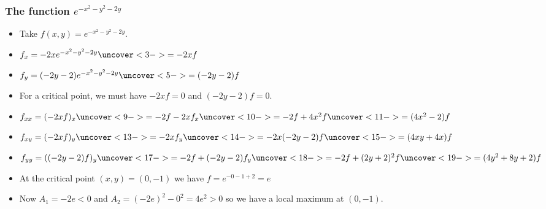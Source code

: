 \documentclass[9pt]{beamer}
\begin{document}
\begin{frame}[t]
 \frametitle{The function $e^{-x^2-y^2-2y}$}
 
 \begin{itemize}
  \item<1-> Take $f(x,y)=e^{-x^2-y^2-2y}$.
  \item<2-> $f_x=-2xe^{-x^2-y^2-2y}\uncover<3->{=-2xf}$
  \item<4-> $f_y=(-2y-2)e^{-x^2-y^2-2y}\uncover<5->{=(-2y-2)f}$
  \item<6-> For a critical point, we must have $-2xf=0$ and $(-2y-2)f=0$.
  \item<8-> $f_{xx}=(-2xf)_x\uncover<9->{=-2f-2xf_x}\uncover<10->{=-2f+4x^2f}\uncover<11->{=(4x^2-2)f}$
  \item<12-> $f_{xy}=(-2xf)_y\uncover<13->{=-2xf_y}\uncover<14->{=-2x(-2y-2)f}\uncover<15->{=(4xy+4x)f}$
  \item<16-> $f_{yy}=((-2y-2)f)_y\uncover<17->{=-2f+(-2y-2)f_y}\uncover<18->{=-2f+(2y+2)^2f}\uncover<19->{=(4y^2+8y+2)f}$
  \item<20-> At the critical point $(x,y)=(0,-1)$ we have
    $f=e^{-0-1+2}=e$ 
  \item<24-> Now $A_1=-2e<0$ and $A_2=(-2e)^2-0^2=4e^2>0$ so we have
   a local maximum at $(0,-1)$.
 \end{itemize}
\end{frame}
\end{document}
